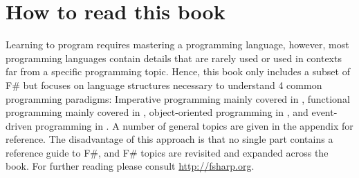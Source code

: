 \section{How to read this book}
Learning to program requires mastering a programming language, however, most programming languages contain details that are rarely used or used in contexts far from a specific programming topic. Hence, this book only includes a subset of F\# but focuses on language structures necessary to understand 4 common programming paradigms: Imperative programming mainly covered in , functional programming mainly covered in , object-oriented programming in , and event-driven programming in .  A number of general topics are given in the appendix for reference. The disadvantage of this approach is that no single part contains a reference guide to F\#, and F\# topics are revisited and expanded across the book. For further reading please consult \url{http://fsharp.org}.

